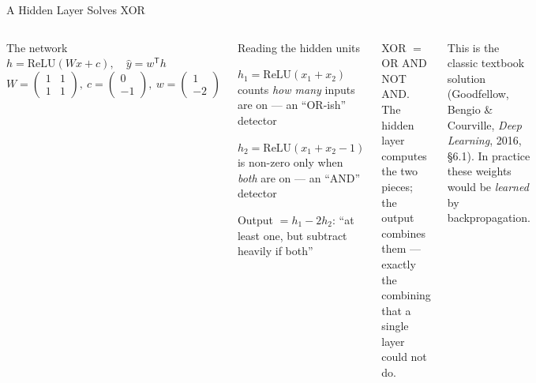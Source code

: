 \documentclass[aspectratio=169,10pt]{beamer}
\begin{document}
\begin{frame}{A Hidden Layer Solves XOR}
\begin{columns}[T]
\begin{fbx}{The network}
$h=\text{ReLU}(Wx+c),\quad \hat y=w^{\mathsf T}h$\\[2pt]
$W=\begin{pmatrix}1&1\\1&1\end{pmatrix},\ c=\begin{pmatrix}0\\-1\end{pmatrix},\ w=\begin{pmatrix}1\\-2\end{pmatrix}$
\end{fbx}
\begin{cbox}{Reading the hidden units}\scriptsize
\begin{tl}
\item $h_1=\text{ReLU}(x_1+x_2)$ counts \emph{how many} inputs are on --- an ``OR-ish'' detector
\item $h_2=\text{ReLU}(x_1+x_2-1)$ is non-zero only when \emph{both} are on --- an ``AND'' detector
\item Output $=h_1-2h_2$: ``at least one, but subtract heavily if both''
\end{tl}
\end{cbox}
\begin{rbox}\scriptsize XOR $=$ OR AND NOT AND. The hidden layer computes the two pieces; the output combines them --- exactly the combining that a single layer could not do.\end{rbox}
\begin{ibox}\scriptsize This is the classic textbook solution (Goodfellow, Bengio \& Courville, \emph{Deep Learning}, 2016, \S6.1). In practice these weights would be \emph{learned} by backpropagation.\end{ibox}
\end{columns}
\end{frame}
\end{document}
